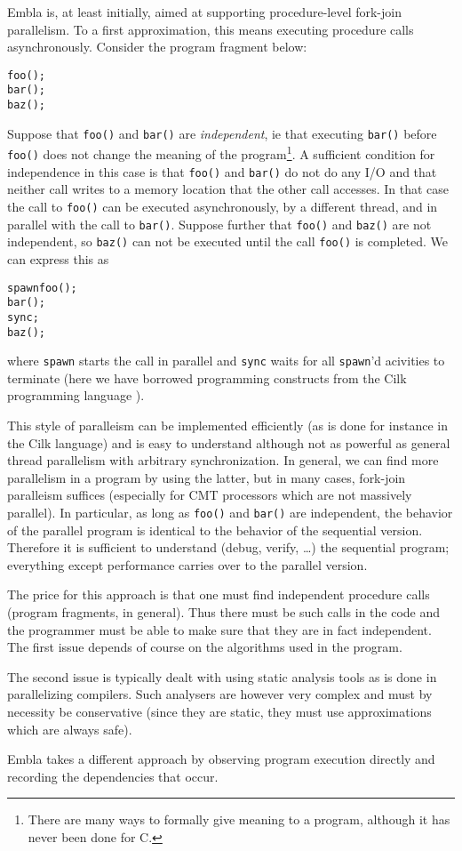 Embla is, at least initially, aimed at supporting procedure-level 
fork-join parallelism. To a first approximation, this means executing 
procedure calls asynchronously. Consider the program fragment below:
\begin{alltt}
   foo();
   bar();
   baz();
\end{alltt}
Suppose that {\tt foo()} and {\tt bar()} are {\em independent}, ie that 
executing {\tt bar()} before {\tt foo()} does not change the meaning of
the program\footnote{There are many ways to formally give meaning to a
program, although it has never been done for C.}. A sufficient condition 
for independence
in this case is that {\tt foo()} and {\tt bar()} do not do any I/O and
that neither call writes to a memory location that the other call 
accesses. In that case the call to {\tt foo()} can be executed
asynchronously, 
by a different thread, and in parallel with the call to {\tt bar()}.
Suppose further that {\tt foo()} and {\tt baz()} are not independent,
so {\tt baz()} can not be executed until the call {\tt foo()} is completed.
We can express this as 
\begin{alltt}
   spawn foo();
   bar();
   sync;
   baz();
\end{alltt}
where {\tt spawn} starts the call in parallel and {\tt sync} waits
for all {\tt spawn}'d acivities to terminate (here we have borrowed 
programming constructs from the Cilk programming language 
\cite{frigo98implementation}).

This style of paralleism can be implemented efficiently (as is done
for instance in the Cilk language) and is easy to understand although
not as powerful as general thread parallelism with arbitrary
synchronization. In general, we can find more parallelism in a program 
by using the latter, but in many cases, fork-join paralleism suffices 
(especially for CMT processors which are not massively parallel).
In particular, as long as {\tt foo()} and {\tt bar()}
are independent, the behavior of the parallel program is identical to
the behavior of the sequential version. Therefore it is sufficient to
understand (debug, verify, \ldots) the sequential program; everything
except performance carries over to the parallel version.

The price for this approach is that one must find independent
procedure calls (program fragments, in general). Thus there must be
such calls in the code and the programmer must be able to make sure
that they are in fact independent. The first issue depends of course
on the algorithms used in the program.

The second issue is typically
dealt with using static analysis tools as is done in parallelizing
compilers. Such analysers are however very complex and must by
necessity be conservative (since they are static, they must use
approximations which are always safe).

Embla takes a different approach by observing program execution
directly and recording the dependencies that occur.



